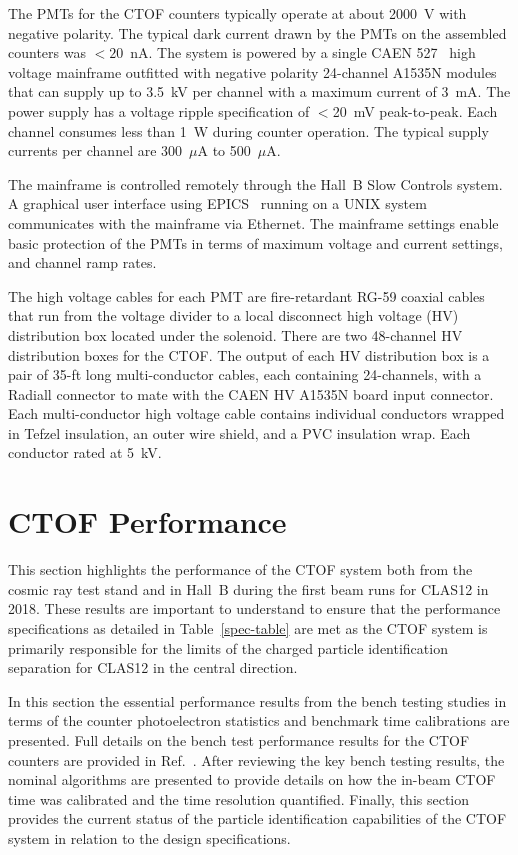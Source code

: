 \documentclass{elsart}
\begin{document}
The PMTs for the CTOF counters typically operate at about 2000~V with negative polarity. The typical
dark current drawn by the PMTs on the assembled counters was $<20$~nA. The system is powered by a
single CAEN 527~\cite{caen-527} high voltage mainframe outfitted with negative polarity 24-channel
A1535N modules that can supply up to 3.5~kV per channel with a maximum current of 3~mA. The power
supply has a voltage ripple specification of $<$20~mV peak-to-peak. Each channel consumes less than
1~W during counter operation. The typical supply currents per channel are 300~$\mu$A to 500~$\mu$A.

The mainframe is controlled remotely through the Hall~B Slow Controls system. A graphical user interface
using EPICS~\cite{epics} running on a UNIX system communicates with the mainframe via Ethernet. The
mainframe settings enable basic protection of the PMTs in terms of maximum voltage and current settings,
and channel ramp rates.

The high voltage cables for each PMT are fire-retardant RG-59 coaxial cables that run from the voltage
divider to a local disconnect high voltage (HV) distribution box located under the solenoid. There are two
48-channel HV distribution boxes for the CTOF. The output of each HV distribution box is a pair of 
35-ft long multi-conductor cables, each containing 24-channels, with a Radiall connector to mate with the
CAEN HV A1535N board input connector. Each multi-conductor high voltage cable contains individual
conductors wrapped in Tefzel insulation, an outer wire shield, and a PVC insulation wrap. Each conductor
rated at 5~kV.

\section{CTOF Performance}
\label{sec:performance}

This section highlights the performance of the CTOF system both from the cosmic ray test stand
and in Hall~B during the first beam runs for CLAS12 in 2018. These results are important to
understand to ensure that the performance specifications as detailed in Table~\ref{spec-table} are
met as the CTOF system is primarily responsible for the limits of the charged particle identification
separation for CLAS12 in the central direction. 

In this section the essential performance results from the bench testing studies in terms of the counter
photoelectron statistics and benchmark time calibrations are presented. Full details on the bench test
performance results for the CTOF counters are provided in Ref.~\cite{dsc-cn2016-009}. After reviewing
the key bench testing results, the nominal algorithms are presented to provide details on how the in-beam
CTOF time was calibrated and the time resolution quantified. Finally, this section provides the current
status of the particle identification capabilities of the CTOF system in relation to the design specifications.
\end{document}
